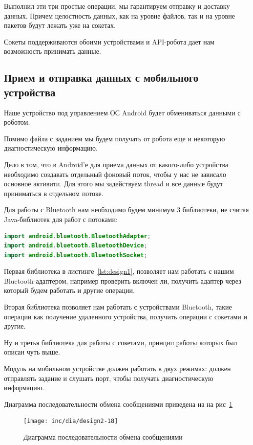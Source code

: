 Выполнил эти три простые операции, мы гарантируем отправку и доставку данных. Причем целостность данных, как на уровне файлов, так и на уровне пакетов будут лежать уже на сокетах.

Сокеты поддерживаются обоими устройствами и API-робота дает нам возможность принимать данные.

\subsection{Прием и отправка данных с мобильного устройства}

Наше устройство под управлением ОС Android будет обмениваться данными с роботом.

Помимо файла с заданием мы будем получать от робота еще и некоторую диагностическую информацию.

Дело в том, что в Android'е для приема данных от какого-либо устройства необходимо создавать отдельный фоновый поток, чтобы у нас не зависало основное активити. Для этого мы задействуем thread и все данные будут приниматься в отдельном потоке.

Для работы с Bluetooth нам необходимо будем минимум 3 библиотеки, не считая Java-библиотек для работ с потоками:
\begin{lstlisting}[caption={Библиотеки для работы с Bluetooth на ОС Android}, label=lst:design2, language=Java]
import android.bluetooth.BluetoothAdapter;
import android.bluetooth.BluetoothDevice;
import android.bluetooth.BluetoothSocket;
\end{lstlisting}

Первая библиотека в листинге~\ref{lst:design1},  позволяет нам работать с нашим Bluetooth-адаптером, например проверить включен ли, получить адаптер через который будем работать и другие операции.

Вторая библиотека позволяет нам работать с устройствами Bluetooth, такие операции как получение удаленного устройства, получить операции с сокетами и другие.

Ну и третья библиотека для работы с сокетами, принцип работы которых был описан чуть выше.

Модуль на мобильном устройстве должен работать в двух режимах: должен отправлять задание и слушать порт, чтобы получать диагностическую информацию.

Диаграмма последовательности обмена сообщениями приведена на на рис~\ref{fig:fig25}
\begin{figure}[ht!]
  \centering
  \texttt{[image: inc/dia/design2-18]}
  \caption{Диаграмма последовательности обмена сообщениями}
  \label{fig:fig25}
\end{figure}



